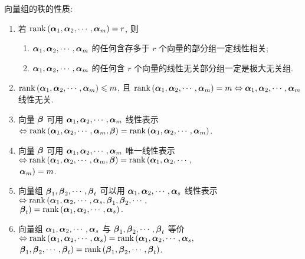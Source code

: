 向量组的秩的性质:
\begin{enumerate}[label=(\arabic{*})]
    \item 若 $ \rank\left(\vb*{\alpha}_{1}, \vb*{\alpha}_{2}, \cdots, \vb*{\alpha}_{m}\right)=r $, 则
          \begin{enumerate}
              \item $\vb*{\alpha}_{1}, \vb*{\alpha}_{2}, \cdots, \vb*{\alpha}_{m} $ 的任何含存多于 $ r $ 个向量的部分组一定线性相关;
              \item $ \vb*{\alpha}_{1}, \vb*{\alpha}_{2}, \cdots, \vb*{\alpha}_{m} $ 的任何含 $ r $ 个向量的线性无关部分组一定是极大无关组.
          \end{enumerate}
    \item $\rank\left(\vb*{\alpha}_{1}, \vb*{\alpha}_{2}, \cdots, \vb*{\alpha}_{m}\right) \leqslant m $, 且 $ \rank\left(\vb*{\alpha}_{1}, \vb*{\alpha}_{2}, \cdots, \vb*{\alpha}_{m}\right)=m \Leftrightarrow \vb*{\alpha}_{1}, \vb*{\alpha}_{2}, \cdots, \vb*{\alpha}_{m} $ 线性无关.
    \item 向量 $ \vb*{\beta} $ 可用 $ \vb*{\alpha}_{1}, \vb*{\alpha}_{2}, \cdots, \vb*{\alpha}_{m} $ 线性表示 $ \Leftrightarrow \rank\left(\vb*{\alpha}_{1}, \vb*{\alpha}_{2}, \cdots, \vb*{\alpha}_{m}, \vb*{\beta}\right)=\rank\left(\vb*{\alpha}_{1}, \vb*{\alpha}_{2}, \cdots, \vb*{\alpha}_{m}\right) $.
    \item 向量 $ \vb*{\beta} $ 可用 $ \vb*{\alpha}_{1}, \vb*{\alpha}_{2}, \cdots, \vb*{\alpha}_{m} $ 唯一线性表示 $ \Leftrightarrow \rank\left(\vb*{\alpha}_{1}, \vb*{\alpha}_{2}, \cdots, \vb*{\alpha}_{m}, \vb*{\beta}\right)=\rank\left(\vb*{\alpha}_{1},\vb*{\alpha}_{2}, \cdots,\right.$\\ $\left.  \vb*{\alpha}_{m}\right)=m $.
    \item 向量组 $ \vb*{\beta}_{1}, \vb*{\beta}_{2}, \cdots, \vb*{\beta}_{t} $ 可以用 $ \vb*{\alpha}_{1}, \vb*{\alpha}_{2}, \cdots, \vb*{\alpha}_{s} $ 线性表示 $ \Leftrightarrow \rank\left(\vb*{\alpha}_{1}, \vb*{\alpha}_{2}, \cdots, \vb*{\alpha}_{s}, \vb*{\beta}_{1}, \vb*{\beta}_{2}, \cdots,\right.$\\$ \left.\vb*{\beta}_{t}\right)=\rank\left(\vb*{\alpha}_{1}, \vb*{\alpha}_{2}, \cdots, \vb*{\alpha}_{s}\right) .$
    \item 向量组 $ \vb*{\alpha}_{1}, \vb*{\alpha}_{2}, \cdots, \vb*{\alpha}_{s} $ 与 $ \vb*{\beta}_{1}, \vb*{\beta}_{2}, \cdots, \vb*{\beta}_{t} $ 等价 $ \Leftrightarrow \rank\left(\vb*{\alpha}_{1}, \vb*{\alpha}_{2}, \cdots, \vb*{\alpha}_{s}\right)=\rank\left(\vb*{\alpha}_{1}, \vb*{\alpha}_{2}, \cdots, \vb*{\alpha}_{s},\right.$\\$\left. \vb*{\beta}_{1}, \vb*{\beta}_{2}, \cdots, \vb*{\beta}_{t}\right)=\rank\left(\vb*{\beta}_{1}, \vb*{\beta}_{2}, \cdots, \vb*{\beta}_{t}\right) $.

\end{enumerate}
